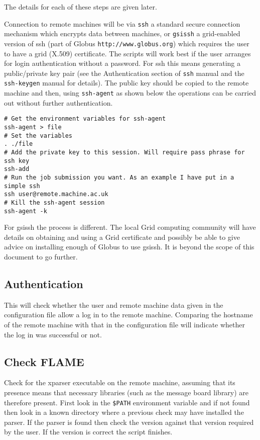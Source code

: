 The details for each of these steps are given later.

Connection to remote machines will be via \texttt{ssh} a standard secure connection mechanism which encrypts data between machines, or \texttt{gsissh} a grid-enabled version of ssh (part of Globus \verb+http://www.globus.org+) which requires the user to have a grid (X.509) certificate. The scripts will work best if the user arranges for login authentication without a password. For ssh this means generating a public/private key pair (see the Authentication section of \texttt{ssh} manual and the \texttt{ssh-keygen} manual for details). The public key should be copied to the remote machine and then, using \texttt{ssh-agent} as shown below the operations can be carried out without further authentication.

\begin{verbatim}
# Get the environment variables for ssh-agent
ssh-agent > file
# Set the variables
. ./file
# Add the private key to this session. Will require pass phrase for ssh key
ssh-add
# Run the job submission you want. As an example I have put in a simple ssh
ssh user@remote.machine.ac.uk
# Kill the ssh-agent session
ssh-agent -k	
\end{verbatim}


For gsissh the process is different. The local Grid computing community will have details on obtaining and using a Grid certificate and possibly be able to give advice on installing enough of Globus to use gsissh. It is beyond the scope of this document to go further.

\subsection{Authentication}

This will check whether the user and remote machine data given in the configuration file allow a log in to the remote machine. Comparing the hostname of the remote machine with that in the configuration file will indicate whether the log in was successful or not.

\subsection{Check FLAME}

Check for the xparser executable on the remote machine, assuming that its presence means that necessary libraries (such as the message board library) are therefore present. First look in the \texttt{\$PATH} environment variable and if not found then look in a known directory where a previous check may have installed the parser. If the parser is found then check the version against that version required by the user. If the version is correct the script finishes. 

